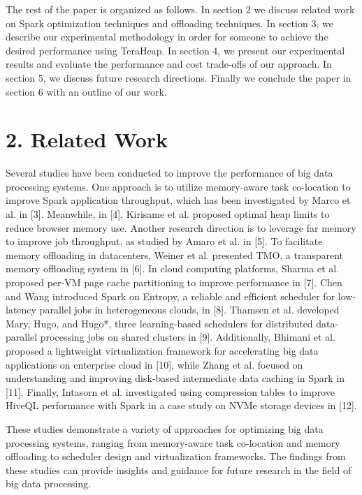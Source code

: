 \documentclass[twocolumn,10pt]{asme2e}
\begin{document}
The rest of the paper is organized as follows. In section 2 we discuss related work on Spark optimization techniques and offloading techniques. In section 3, we describe our experimental methodology in order for someone to achieve the desired performance using TeraHeap. In section 4, we present our experimental results and evaluate the performance and cost trade-offs of our approach. In section 5, we discuss future research directions. Finally we conclude the paper in section 6 with an outline of our work.

\section*{2. Related Work}

Several studies have been conducted to improve the performance of big data processing systems. One approach is to utilize memory-aware task co-location to improve Spark application throughput, which has been investigated by Marco et al. in [3]. Meanwhile, in [4], Kirisame et al. proposed optimal heap limits to reduce browser memory use. Another research direction is to leverage far memory to improve job throughput, as studied by Amaro et al. in [5]. To facilitate memory offloading in datacenters, Weiner et al. presented TMO, a transparent memory offloading system in [6]. In cloud computing platforms, Sharma et al. proposed per-VM page cache partitioning to improve performance in [7]. Chen and Wang introduced Spark on Entropy, a reliable and efficient scheduler for low-latency parallel jobs in heterogeneous clouds, in [8]. Thamsen et al. developed Mary, Hugo, and Hugo*, three learning-based schedulers for distributed data-parallel processing jobs on shared clusters in [9]. Additionally, Bhimani et al. proposed a lightweight virtualization framework for accelerating big data applications on enterprise cloud in [10], while Zhang et al. focused on understanding and improving disk-based intermediate data caching in Spark in [11]. Finally, Intasorn et al. investigated using compression tables to improve HiveQL performance with Spark in a case study on NVMe storage devices in [12]. 

These studies demonstrate a variety of approaches for optimizing big data processing systems, ranging from memory-aware task co-location and memory offloading to scheduler design and virtualization frameworks. The findings from these studies can provide insights and guidance for future research in the field of big data processing.
\end{document}
